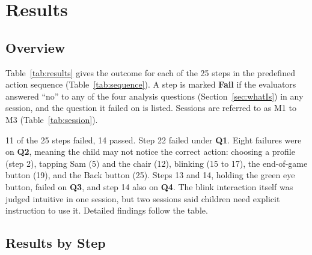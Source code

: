 \documentclass{article}
\newcommand{\fail}{{\textbf{Fail}}}
\newcommand{\crit}[1]{\textbf{Q#1}}
\begin{document}
\section{Results}\label{sec:results}

\subsection{Overview}

Table~\ref{tab:results} gives the outcome for each of the 25 steps in the predefined action sequence 
(Table~\ref{tab:sequence}). A step is marked \fail{} if the evaluators answered ``no'' to any of the 
four analysis questions (Section~\ref{sec:whatIs}) in any session, and the question it failed on is listed. Sessions 
are referred to as M1 to M3 (Table~\ref{tab:session}).

11 of the 25 steps failed, 14 passed. Step 22 failed under \crit{1}. Eight failures were on \crit{2},
meaning the child may not notice the correct action: choosing a profile (step 2), tapping Sam (5) and the chair (12), 
blinking (15 to 17), the end-of-game button (19), and the Back button (25). Steps 13 and 14, holding the green eye 
button, failed on \crit{3}, and step 14 also on \crit{4}. The blink interaction itself was judged intuitive in one 
session, but two sessions said children need explicit instruction to use it. Detailed findings follow the table.

\subsection{Results by Step}
\end{document}
